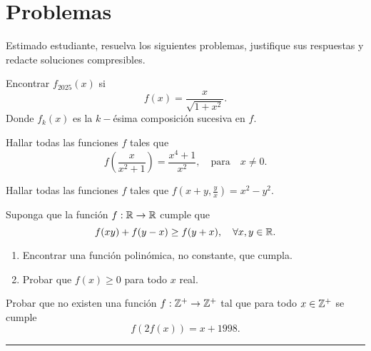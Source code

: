 \section*{Problemas}

Estimado estudiante, resuelva los siguientes problemas, justifique sus respuestas y redacte soluciones compresibles.

\begin{exercise*}
    Encontrar $f_{2025}(x)$ si
    \[
        f(x) = \frac{x}{\sqrt {1 + x^2}}.
    \]
    Donde $f_k(x)$ es la $k-$ésima composición sucesiva en $f$.
\end{exercise*}

\begin{exercise*}
    Hallar todas las funciones $f$ tales que
    \[
        f\left(\frac{x}{x^2 + 1}\right) = \frac{x^4 + 1}{x^2}, \quad \text{para}\quad x \neq 0.
    \]
\end{exercise*}

\begin{problem*}
    Hallar todas las funciones $f$ tales que $f\left(x + y, \frac{y}{x}\right) = x^2 - y^2$.
\end{problem*}

\begin{problem*}
    Suponga que la función $f: \mathbb{R} \to \mathbb{R}$ cumple que
    \[
        f(xy) + f(y - x) \geq f(y + x), \quad \forall x,y \in \mathbb{R}.
    \]
    \begin{enumerate}
        \item Encontrar una función polinómica, no constante, que cumpla.
        \item Probar que $f(x) \geq 0$ para todo $x$ real.
    \end{enumerate}
\end{problem*}

\begin{problem*}
    Probar que no existen una función $f : \mathbb{Z}^+ \to \mathbb{Z}^+$ tal que para todo $x \in \mathbb{Z}^+$ se cumple
    \[
        f(2f(x)) = x + 1998.
    \]
\end{problem*}

\hrule